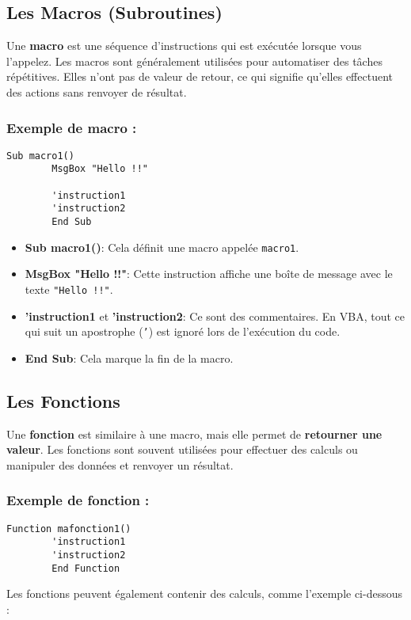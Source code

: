 \documentclass[a4paper,12pt]{report}
\begin{document}
	\subsection{Les Macros (Subroutines)}
	Une \textbf{macro} est une séquence d'instructions qui est exécutée lorsque vous l'appelez. Les macros sont généralement utilisées pour automatiser des tâches répétitives. Elles n'ont pas de valeur de retour, ce qui signifie qu'elles effectuent des actions sans renvoyer de résultat.
	\newpage
	\subsubsection*{Exemple de macro :}
	\begin{lstlisting}[caption=Macro simple]
		Sub macro1()
		MsgBox "Hello !!"
		
		'instruction1
		'instruction2
		End Sub
	\end{lstlisting}
	
	\begin{itemize}
		\item \textbf{Sub macro1()}: Cela définit une macro appelée \texttt{macro1}.
		\item \textbf{MsgBox "Hello !!"}: Cette instruction affiche une boîte de message avec le texte \texttt{"Hello !!"}.
		\item \textbf{'instruction1} et \textbf{'instruction2}: Ce sont des commentaires. En VBA, tout ce qui suit un apostrophe (\texttt{'}) est ignoré lors de l'exécution du code.
		\item \textbf{End Sub}: Cela marque la fin de la macro.
	\end{itemize}
	
	\subsection{Les Fonctions}
	Une \textbf{fonction} est similaire à une macro, mais elle permet de \textbf{retourner une valeur}. Les fonctions sont souvent utilisées pour effectuer des calculs ou manipuler des données et renvoyer un résultat. 
	
	\subsubsection*{Exemple de fonction :}
	\begin{lstlisting}[caption=Définition d'une fonction]
		Function mafonction1()
		'instruction1
		'instruction2
		End Function
	\end{lstlisting}
	\newpage
	Les fonctions peuvent également contenir des calculs, comme l'exemple ci-dessous :
	
\end{document}
